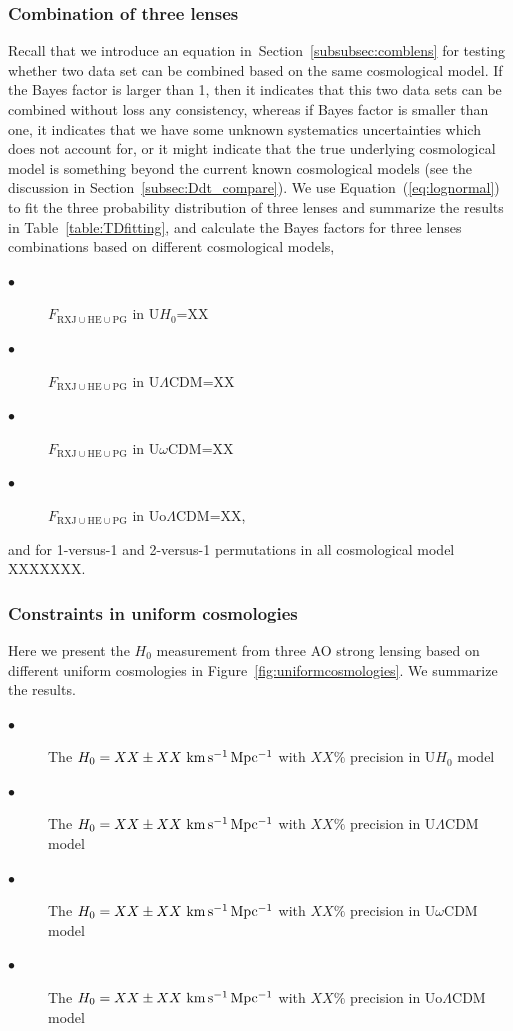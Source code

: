 \documentclass[useAMS,usenatbib]{mnras}
\newcommand{\sref}[1]{Section~\ref{#1}}
\newcommand{\fref}[1]{Figure~\ref{#1}}
\newcommand{\tref}[1]{Table~\ref{#1}}
\newcommand{\eref}[1]{Equation~(\ref{#1})}
\def\kmsmpc{\rm km\,s^{-1}\,Mpc^{-1}}
\begin{document}
\subsubsection{Combination of three lenses}
Recall that we introduce an equation in~\sref{subsubsec:comblens} for testing whether two data set can be combined based on the same cosmological model. If the Bayes factor is larger than 1, then it indicates that this two data sets can be combined without loss any consistency, whereas if Bayes factor is smaller than one, it indicates that we have some unknown systematics uncertainties which does not account for, or it might indicate that the true underlying cosmological model is something beyond the current known cosmological models (see the discussion in \sref{subsec:Ddt_compare}).
We use \eref{eq:lognormal} to fit the three probability distribution of three lenses and summarize the results in \tref{table:TDfitting}, and calculate the Bayes factors for three lenses combinations based on different cosmological models,
\begin{description}
	\item[$\bullet$] $F_{\textrm{RXJ}\cup\textrm{HE}\cup\textrm{PG}}$ in U$H_{0}$=XX
    \item[$\bullet$] $F_{\textrm{RXJ}\cup\textrm{HE}\cup\textrm{PG}}$ in U$\Lambda$CDM=XX
    \item[$\bullet$] $F_{\textrm{RXJ}\cup\textrm{HE}\cup\textrm{PG}}$ in U$\omega$CDM=XX
    \item[$\bullet$] $F_{\textrm{RXJ}\cup\textrm{HE}\cup\textrm{PG}}$ in Uo$\Lambda$CDM=XX,
\end{description}
and for 1-versus-1 and 2-versus-1 permutations in all cosmological model XXXXXXX.

\subsubsection{Constraints in uniform cosmologies}
Here we present the $H_{0}$ measurement from three AO strong lensing based on different uniform cosmologies in \fref{fig:uniformcosmologies}. We summarize the results.
\begin{description}
	\item[$\bullet$] The $H_{0}=XX\pm XX~\kmsmpc$ with $XX\%$ precision in U$H_{0}$ model
    \item[$\bullet$] The $H_{0}=XX\pm XX~\kmsmpc$ with $XX\%$ precision in U$\Lambda$CDM model
    \item[$\bullet$] The $H_{0}=XX\pm XX~\kmsmpc$ with $XX\%$ precision in U$\omega$CDM model
    \item[$\bullet$] The $H_{0}=XX\pm XX~\kmsmpc$ with $XX\%$ precision in Uo$\Lambda$CDM model
\end{description}
\end{document}
